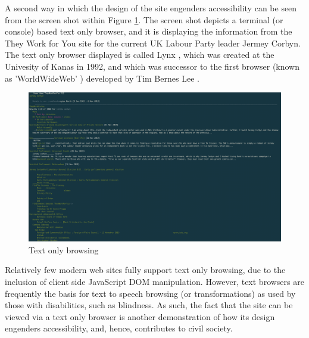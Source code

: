 A second way in which the design of the site engenders accessibility can be seen from the screen shot within Figure \ref{fig:they-work-for-you-implementation-text-only-lynx}.
The screen shot depicts a terminal (or console) based text only browser, and it is displaying the information from the They Work for You site for the current UK Labour Party leader Jermey Corbyn.
The text only browser displayed is called Lynx \cite{lynx}, which was created at the Univesity of Kanas in 1992, and which was successor to the first browser (known as 'WorldWideWeb' \cite{browser-history}) developed by Tim Bernes Lee \cite{tim-berners-lee}.

\begin{figure}[h]
  \centering
  \includegraphics[scale=0.20]{images/they-work-for-you-implementation-text-only-lynx}
  \caption{Text only browsing}
  \label{fig:they-work-for-you-implementation-text-only-lynx}
\end{figure}

Relatively few modern web sites fully support text only browsing, due to the inclusion of client side JavaScript DOM manipulation.
However, text browsers are frequently the basis for text to speech browsing (or transformations) as used by those with disabilities, such as blindness.
As such, the fact that the site can be viewed via a text only browser is another demonstration of how its design engenders accessibility, and, hence, contributes to civil society.
